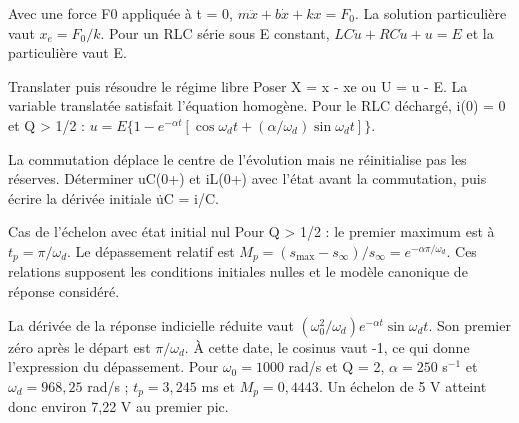 Avec une force F0 appliquée à t = 0, $m\ddot x+b\dot x+kx=F_0$. La solution particulière vaut $x_e=F_0/k$. Pour un RLC série sous E constant, $LC\ddot u+RC\dot u+u=E$ et la particulière vaut E.
\begin{loi}{Translater puis résoudre le régime libre}
Poser X = x - xe ou U = u - E. La variable translatée satisfait l’équation homogène. Pour le RLC déchargé, i(0) = 0 et Q > 1/2 : $u=E\{1-e^{-\alpha t}[\cos\omega_dt+(\alpha/\omega_d)\sin\omega_dt]\}$.
\end{loi}
La commutation déplace le centre de l’évolution mais ne réinitialise pas les réserves. Déterminer uC(0+) et iL(0+) avec l’état avant la commutation, puis écrire la dérivée initiale u̇C = i/C.


\begin{loi}{Cas de l’échelon avec état initial nul}
Pour Q > 1/2 : le premier maximum est à $t_p=\pi/\omega_d$. Le dépassement relatif est $M_p=(s_{\max}-s_\infty)/s_\infty=e^{-\alpha\pi/\omega_d}$. Ces relations supposent les conditions initiales nulles et le modèle canonique de réponse considéré.
\end{loi}
La dérivée de la réponse indicielle réduite vaut $(\omega_0^2/\omega_d)e^{-\alpha t}\sin\omega_dt$. Son premier zéro après le départ est $\pi/\omega_d$. À cette date, le cosinus vaut -1, ce qui donne l’expression du dépassement.
Pour $\omega_0=1000$ rad/s et Q = 2, $\alpha=250$ s$^{-1}$ et $\omega_d=968{,}25$ rad/s ; $t_p=3{,}245$ ms et $M_p=0{,}4443$. Un échelon de 5 V atteint donc environ 7,22 V au premier pic.


